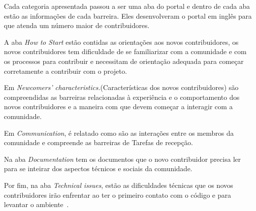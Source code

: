 Cada categoria apresentada passou a ser uma aba do portal e dentro de cada aba 
estão as informações de cada barreira. Eles desenvolveram o portal em inglês
para que atenda um número maior de contribuidores.

A aba \textit{How to Start} estão contidas as orientações aos novos contribuidores, os novos
contribuidores tem dificuldade de se familiarizar com a comunidade e com os processos
para contribuir e necessitam de orientação adequada para começar corretamente a
contribuir com o projeto.

Em \textit{Newcomers’ characteristics.}(Características dos novos contribuidores) são 
compreendidas as barreiras relacionadas à experiência e o comportamento dos novos 
contribuidores e a maneira com que devem começar a interagir com a comunidade.

Em \textit{Communication}, é relatado como são as interações entre 
os membros da comunidade e compreende as barreiras de Tarefas de recepção.

Na aba \textit{Documentation} tem os documentos que o novo contribuidor precisa ler 
para se inteirar dos aspectos técnicos e sociais da comunidade.

Por fim, na aba \textit{Technical issues}, estão as dificuldades técnicas que os novos
contribuidores irão enfrentar ao ter o primeiro contato com o código e para levantar
o ambiente~\cite{steinmancher2015}.



